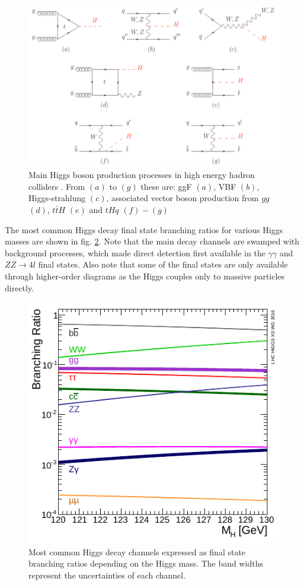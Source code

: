 \begin{figure}[h!]
	\centering
	\includegraphics[width=0.8\linewidth]{figures/theory/higgsproduction.png}
	\caption{Main Higgs boson production processes in high energy hadron colliders \cite{Workman:2022ynf}. From $(a)$ to $(g)$ these are: ggF $(a)$, VBF $(b)$, Higgs-strahlung $(c)$, associated vector boson production from $gg$ $(d)$, $t\bar{t}H$ $(e)$ and $tHq$ $(f)-(g)$}
	\label{fig:higgsproduction}
\end{figure}

The most common Higgs decay final state branching ratios for various Higgs masses are shown in fig. \ref{fig:higgsbranch}. Note that the main decay channels are swamped with background processes, which made direct detection first available in the $\gamma\gamma$ and $ZZ\rightarrow4l$ final states. Also note that some of the final states are only available through higher-order diagrams as the Higgs couples only to massive particles directly.

\begin{figure}[h!]
	\centering
	\includegraphics[width=0.6\linewidth]{figures/theory/higgsdecay.pdf}
	\caption{Most common Higgs decay channels expressed as final state branching ratios depending on the Higgs mass. The band widths represent the uncertainties of each channel. \cite{HiggsCrossSections}}
	\label{fig:higgsbranch}
\end{figure}

